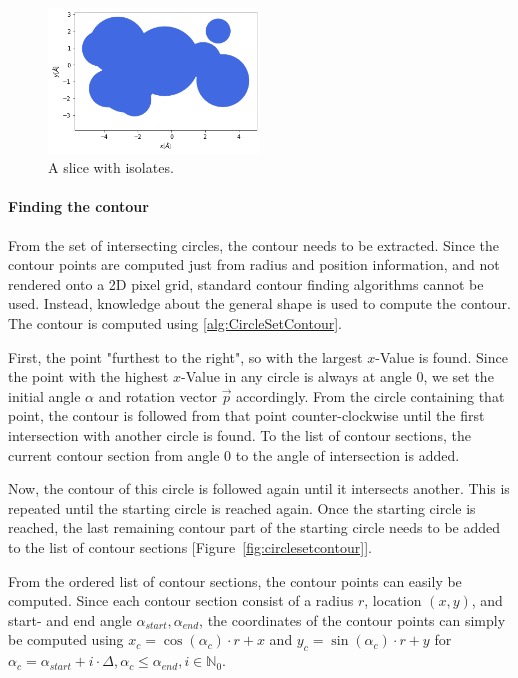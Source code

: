 \begin{figure} [h]
  \centering
  \includegraphics[width=0.5\textwidth]{figures/fourier/slice-iso.png} %
  \caption[Visualization of a slice with isolates]{A slice with isolates.}
  \label{fig:slice}
\end{figure}

\paragraph{Finding the contour}

From the set of intersecting circles, the contour needs to be extracted. 
Since the contour points are computed just from radius and position information, and not rendered onto a 2D pixel grid, standard contour finding algorithms cannot be used.
Instead, knowledge about the general shape is used to compute the contour. 
The contour is computed using \autoref{alg:CircleSetContour}.

First, the point "furthest to the right", so with the largest $x$-Value is found. 
Since the point with the highest $x$-Value in any circle is always at angle 0, we set the initial angle $\alpha$ and rotation vector $\vec{p}$ accordingly.
From the circle containing that point, the contour is followed from that point counter-clockwise until the first intersection with another circle is found.
To the list of contour sections, the current contour section from angle $0$ to the angle of intersection is added.

Now, the contour of this circle is followed again until it intersects another.
This is repeated until the starting circle is reached again.
Once the starting circle is reached, the last remaining contour part of the starting circle needs to be added to the list of contour sections [Figure~\ref{fig:circlesetcontour}].

From the ordered list of contour sections, the contour points can easily be computed.
Since each contour section consist of a radius $r$, location $(x,y)$, and start- and end angle $\alpha_{start}, \alpha_{end}$, the coordinates of the contour points can simply be computed using $x_c = \cos(\alpha_c) \cdot r + x$ and  $y_c = \sin(\alpha_c) \cdot r + y$ 
for $\alpha_c = \alpha_{start} + i \cdot \Delta, \alpha_c \leq \alpha_{end}, i \in \mathbb{N}_0$.

